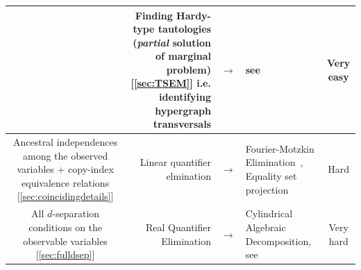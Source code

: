 {\begin{table}[ht]
\begin{tabularx}{\linewidth}{ |c|RlL|c| }
 & Finding Hardy-type tautologies \linebreak  (\emph{partial} solution of marginal problem) [\cref{sec:TSEM}] \linebreak i.e. identifying hypergraph transversals & $\to$ & see~\citet{eiter_dualization_2008} & Very easy \\
\hline




\parbox{5cm}{Ancestral independences among the observed variables + copy-index equivalence relations [\cref{sec:coincidingdetails}]} & Linear quantifier elmination & $\to$ & Fourier-Motzkin Elimination~\cite{fordan1999projection,DantzigEaves,Bastrakov2015,BalasProjectionCone,Jones2008}, \linebreak Equality set projection \cite{JonesThesis2005,jones2004equality} & Hard \\
\hline

\parbox{5cm}{All $d$-separation conditions on the observable variables [\cref{sec:fulldsep}]} & Real Quantifier Elimination & $\to$ & Cylindrical Algebraic Decomposition, see \cite{ChavesPolynomial} & Very hard \\

\bottomrule
\end{tabularx}
\label{table:difficulties}
\end{table}


}
